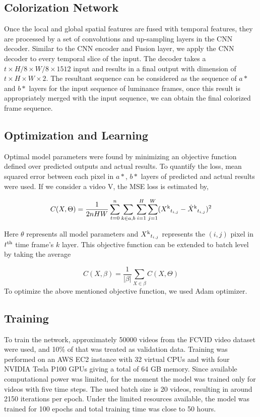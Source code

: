 \documentclass[10pt,twocolumn,letterpaper]{article}
\begin{document}
\subsection{Colorization Network}
Once the local and global spatial features are fused with temporal features, they are processed by a set of convolutions and up-sampling layers in the CNN decoder. Similar to the CNN encoder and Fusion layer, we apply the CNN decoder to every temporal slice of the input. The decoder takes a $t\times H/8\times W/8\times 1512$ input and results in a final output with dimension of $t\times H\times W\times 2$. The resultant sequence can be considered as the sequence of $a*$ and $b*$ layers for the input sequence of luminance frames, once this result is appropriately merged with the input sequence, we can obtain the final colorized frame sequence.

\subsection{Optimization and Learning}
Optimal model parameters were found by minimizing an objective function defined over predicted outputs and actual results. To quantify the loss, mean squared error between each pixel in $a*$, $b*$ layers of predicted and actual results were used. If we consider a video V, the MSE loss is estimated by,

\begin{equation}
\small
C(X,\Theta ) = \frac{1}{2nHW}\sum_{t=0}^{n}\sum_{k\in {a,b}}\sum_{i=1}^{H}\sum_{j=1}^{W} (X\textsuperscript{k}_{t_{i,j}} - \hat{X}\textsuperscript{k}_{t_{i,j}}) ^ 2
\end{equation}

Here $\theta$ represents all model parameters and $X\textsuperscript{k}_{t_{i,j}}$ represents the $(i,j)$ pixel in $t\textsuperscript{th}$ time frame's $k$ layer. This objective function can be extended to batch level by taking the average 

\begin{equation}
C(X,\beta) = \frac{1}{\left | \beta  \right |}\sum_{X\in {\beta}} C(X,\Theta)
\end{equation}
To optimize the above mentioned objective function, we used Adam optimizer. \cite{DBLP:journals/corr/KingmaB14}

\subsection{Training}
To train the network, approximately 50000 videos from the FCVID \cite{FCVID} video dataset were used, and 10\% of that was treated as validation data. Training was performed on an AWS EC2 instance with 32 virtual CPUs and with four NVIDIA Tesla P100 GPUs giving a total of 64 GB memory. 
Since available computational power was limited, for the moment the model was trained only for videos with five time steps. The used batch size is 20 videos, resulting in around 2150 iterations per epoch. Under the limited resources available, the model was trained for 100 epochs and total training time was close to 50 hours. 
\end{document}
